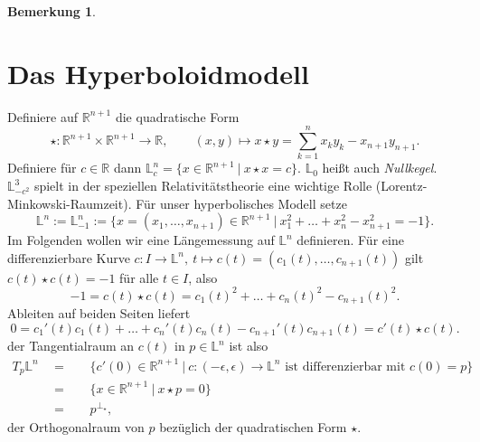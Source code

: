 \documentclass[11pt]{book}
\numberwithin{dummy}{section}
\newtheorem{remark}[theorem]{Bemerkung}
\theoremstyle{nonumberbreak}
\newcommand{\Loid}{\mathbb{L}}
\newcommand{\R}{\mathbb{R}}
\newcommand{\la}{\longrightarrow}
\begin{document}
\begin{spacing}{1.4}
\begin{remark}
\end{remark}





 

\newpage





\section{Das Hyperboloidmodell} %



Definiere auf $\R^{n+1}$ die quadratische Form 
$$\star: \R^{n+1} \times \R^{n+1} \la \R, \qquad (x,y) \mapsto x\star y = \sum_{k=1}^n x_ky_k - x_{n+1}y_{n+1}.$$
Definiere für $c \in \R$ dann $\Loid^n_c = \{ x \in \R^{n+1} \ \vert \ x \star x = c \}$.
$\Loid_0$ heißt auch \textit{Nullkegel}. $\Loid^3_{-c^2}$ spielt in der speziellen Relativitätstheorie eine wichtige Rolle (Lorentz-Minkowski-Raumzeit). Für unser hyperbolisches Modell setze
$$\Loid^n := \Loid^n_{-1} := \{ x=(x_1, \ldots, x_{n+1}) \in \R^{n+1} \ \vert \ x_1^2 + \ldots + x_n^2 - x_{n+1}^2 = -1 \}.$$
Im Folgenden wollen wir eine Längemessung auf $\Loid^n$ definieren. Für eine differenzierbare Kurve  $c: I \la \Loid^n, \ t \mapsto c(t)=(c_1(t), \ldots, c_{n+1}(t))$ gilt $c(t) \star c(t) = -1$ für alle $t \in I$, also 
$$-1 = c(t) \star c(t) = c_1(t)^2 + \ldots + c_n(t)^2 - c_{n+1}(t)^2.$$
Ableiten auf beiden Seiten liefert
$$0 = c_1'(t) c_1(t) + \ldots + c_n'(t) c_n(t) - c_{n+1}'(t) c_{n+1}(t) = c'(t) \star c(t).$$
der Tangentialraum an $c(t)$ in $p \in \Loid^n$ ist also 
\begin{alignat*}{5}
T_p \Loid^n \ \ &=&& \ \ \{ c'(0) \in \R^{n+1} \ \vert \ c:(-\epsilon, \epsilon) \la \Loid^n \textrm{ ist differenzierbar mit }c(0) = p\} \\
&=&& \ \ \{ x \in \R^{n+1} \ \vert \ x \star p = 0 \}\\
&=&& \ \ p^{\perp_{\star}},
\end{alignat*}
der Orthogonalraum von $p$ bezüglich der quadratischen Form $\star$.



\end{spacing}
\end{document}

